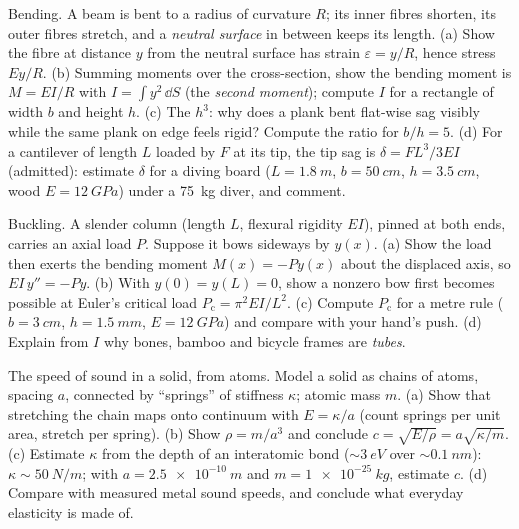 \begin{exercise}[$\star\star\star$]\label{exo:b3:continuum-elasticity:10}
Bending. A beam is bent to a radius of curvature $R$; its inner fibres
shorten, its outer fibres stretch, and a \emph{neutral surface} in
between keeps its length. (a) Show the fibre at distance $y$ from the
neutral surface has strain $\varepsilon = y/R$, hence stress $Ey/R$.
(b) Summing moments over the cross-section, show the bending moment is
$M = EI/R$ with $I = \int y^2\,\dd S$ (the \emph{second moment});
compute $I$ for a rectangle of width $b$ and height $h$. (c) The
$h^3$: why does a plank bent flat-wise sag visibly while the same
plank on edge feels rigid? Compute the ratio for $b/h = 5$. (d) For a
cantilever of length $L$ loaded by $F$ at its tip, the tip sag is
$\delta = FL^3/3EI$ (admitted): estimate $\delta$ for a diving board
($L = \qty{1.8}{m}$, $b = \qty{50}{cm}$, $h = \qty{3.5}{cm}$, wood $E
= \qty{12}{GPa}$) under a \qty{75}{kg} diver, and comment.
\end{exercise}

\begin{exercise}[$\star\star\star$]\label{exo:b3:continuum-elasticity:11}
Buckling. A slender column (length $L$, flexural rigidity $EI$),
pinned at both ends, carries an axial load $P$. Suppose it bows
sideways by $y(x)$. (a) Show the load then exerts the bending moment
$M(x) = -Py(x)$ about the displaced axis, so $EI\,y'' = -Py$. (b) With
$y(0) = y(L) = 0$, show a nonzero bow first becomes possible at
Euler's critical load
$P_{\text{c}} = \pi^2EI/L^2$. (c) Compute $P_{\text{c}}$ for a metre
rule ($b = \qty{3}{cm}$, $h = \qty{1.5}{mm}$, $E = \qty{12}{GPa}$) and
compare with your hand's push. (d) Explain from $I$ why bones,
bamboo and bicycle frames are \emph{tubes}.
\end{exercise}

\begin{exercise}[$\star\star\star$]\label{exo:b3:continuum-elasticity:12}
The speed of sound in a solid, from atoms. Model a solid as chains of
atoms, spacing $a$, connected by ``springs'' of stiffness $\kappa$;
atomic mass $m$. (a) Show that stretching the chain maps onto
continuum  with $E = \kappa/a$ (count springs per unit area,
stretch per spring). (b) Show $\rho = m/a^3$ and conclude $c =
\sqrt{E/\rho} = a\sqrt{\kappa/m}$. (c) Estimate $\kappa$ from the
depth of an interatomic bond ($\sim\qty{3}{eV}$ over $\sim
\qty{0.1}{nm}$): $\kappa \sim \qty{50}{N/m}$; with $a =
\qty{2.5e-10}{m}$ and $m = \qty{1e-25}{kg}$, estimate $c$. (d) Compare
with measured metal sound speeds, and conclude what everyday
elasticity is made of.
\end{exercise}

